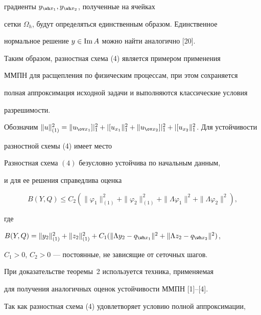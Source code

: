 градиенты $y_{\wh x_1},y_{\wh x_2}$, полученные на ячейках


сетки $\Omega_h$, будут определяться единственным образом. Единственное


нормальное решение $y\in\operatorname{Im} A$ можно найти аналогично [20].





Таким образом, разностная схема (4) является примером применения


ММПН для расщепления по физическим процессам, при этом сохраняется


полная аппроксимация исходной задачи и выполняются классические условия


разрешимости.





Обозначим $\|u\|_{(1)}^2=\|u_{\ov x_1}]|_1^2+|[u_{x_1}\|_1^2


+\|u_{\ov x_2}]|_1^2+|[u_{x_2}\|_1^2$. Для устойчивости


разностной схемы (4) имеет место





\begin{thm}


Разностная схема $(4)$ безусловно устойчива по начальным данным,


и для ее решения справедлива оценка


$$


B(Y,Q)\leq C_2(\|\varphi_1\|_{(1)}^2+


\|\varphi_2\|_{(1)}^2+\|\Lambda\varphi_1\|^2+\|\Lambda\varphi_2\|^2),


$$


где


$B(Y,Q)=\|y_2\|_{(1)}^2+\|z_2\|_{(1)}^2+C_1(\|\Lambda y_2-


q_{\wh x_1}\|^2+\|\Lambda z_2-q_{\wh x_2}\|^2)$,


$C_1>0$, $C_2>0$ --- постоянные, не зависящие от сеточных шагов.


\end{thm}





При доказательстве теоремы~2 используется техника, применяемая


для получения аналогичных оценок устойчивости ММПН [1]--[4].


Так как разностная схема (4) удовлетворяет условию полной аппроксимации,



